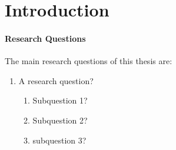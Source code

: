 \documentclass[../paper.tex]{subfiles}
\begin{document}
    \section{Introduction}
    \lipsum[1]

    \paragraph{Research Questions}\label{par:research-questions}
    The main research questions of this thesis are:
    \begin{enumerate}
        \item A research question?\label{RQ1}
            \begin{enumerate}[label*=\arabic*.]
                \item Subquestion 1?\label{RQ1.1}
                \item Subquestion 2?\label{RQ1.2}
                \item subquestion 3?\label{RQ1.3}
            \end{enumerate}
    \end{enumerate}
    \ifSubfilesClassLoaded{%
        \printbibliography{}%
    }{}
\end{document}
